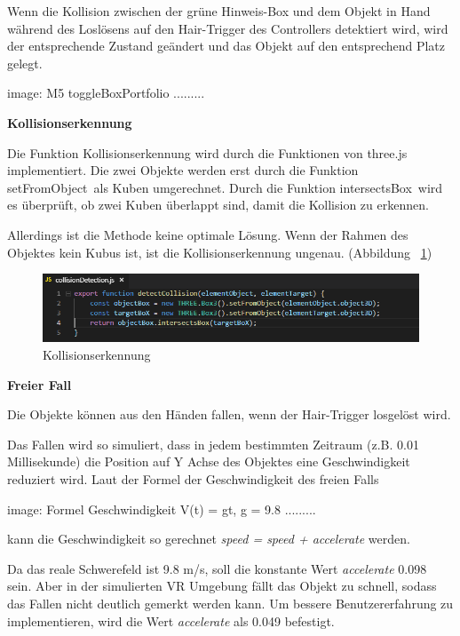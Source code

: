   Wenn die Kollision zwischen der grüne Hinweis-Box und dem Objekt in Hand während des Loslösens auf den Hair-Trigger des Controllers detektiert wird, wird der entsprechende Zustand geändert und das Objekt auf den entsprechend Platz gelegt.
  
  image: M5 toggleBoxPortfolio .........
  
  \textbf{Kollisionserkennung}
  
  Die Funktion Kollisionserkennung wird durch die Funktionen von three.js implementiert. Die zwei Objekte werden erst durch die Funktion \glqq setFromObject\grqq\ als Kuben umgerechnet. Durch die Funktion \glqq intersectsBox\grqq\ wird es überprüft, ob zwei Kuben überlappt sind, damit die Kollision zu erkennen.
  
  Allerdings ist die Methode keine optimale Lösung. Wenn der Rahmen des Objektes kein Kubus ist, ist die Kollisionserkennung ungenau. (Abbildung ~\ref{fig:collisionDetection})
  
\begin{figure}[ht]
\vspace*{0.3cm}
\centering
\includegraphics[width=\textwidth]{images/collisionDetection.png}
\caption[Kollisionserkennung]{Kollisionserkennung}
\label{fig:collisionDetection} 
\end{figure}
  
  \textbf{Freier Fall}
  
  Die Objekte können aus den Händen fallen, wenn der Hair-Trigger losgelöst wird.
  
  Das Fallen wird so simuliert, dass in jedem bestimmten Zeitraum (z.B. 0.01 Millisekunde) die Position auf Y Achse des Objektes eine Geschwindigkeit reduziert wird. Laut der Formel der Geschwindigkeit des freien Falls 
  
  image: Formel Geschwindigkeit V(t) = gt, g = 9.8 .........
  
  kann die Geschwindigkeit so gerechnet \textit{speed = speed + accelerate} werden. 
  
  Da das reale Schwerefeld ist 9.8 m/s, soll die konstante Wert \textit{accelerate} 0.098 sein. Aber in der simulierten VR Umgebung fällt das Objekt zu schnell, sodass das Fallen nicht deutlich gemerkt werden kann. Um bessere Benutzererfahrung zu implementieren, wird die Wert \textit{accelerate} als 0.049 befestigt.
  
